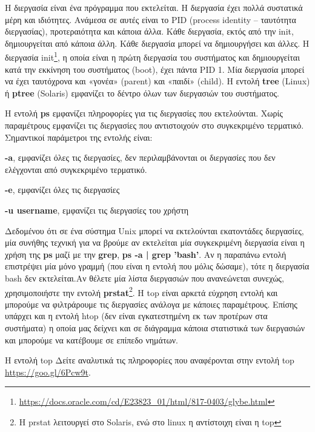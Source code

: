 Η διεργασία είναι ένα πρόγραμμα που εκτελείται. Η διεργασία έχει πολλά συστατικά  μέρη και ιδιότητες. Ανάμεσα σε αυτές είναι το PID (process
identity – ταυτότητα διεργασίας), προτεραιότητα και κάποια άλλα. Κάθε διεργασία, εκτός από την init, δημιουργείται από κάποια άλλη. Κάθε
διεργασία μπορεί να δημιουργήσει και άλλες. Η διεργασία init\footnote{\href{https://docs.oracle.com/cd/E23823\_01/html/817-0403/glybe.html}{https://docs.oracle.com/cd/E23823\_01/html/817-0403/glybe.html}}, η οποία είναι η πρώτη διεργασία του συστήματος και δημιουργείται κατά την
εκκίνηση του συστήματος (boot), έχει πάντα PID 1. Μία διεργασία μπορεί να έχει ταυτόχρονα και «γονέα» (parent) και «παιδί» (child). Η εντολή
\textbf{tree} (Linux) ή \textbf{ptree} (Solaris) εμφανίζει το δέντρο όλων των διεργασιών του συστήματος.

Η εντολή \textbf{ps} εμφανίζει πληροφορίες για τις διεργασίες που εκτελούνται.  Χωρίς παραμέτρους εμφανίζει τις διεργασίες που αντιστοιχούν
στο συγκεκριμένο τερματικό. Σημαντικοί παράμετροι της εντολής είναι:

\begin{packed_item}
	\item   \textbf{-a}, εμφανίζει όλες τις διεργασίες, δεν περιλαμβάνονται οι διεργασίες που δεν ελέγχονται από συγκεκριμένο τερματικό.
	\item   \textbf{-e}, εμφανίζει όλες τις διεργασίες
	\item   \textbf{-u username}, εμφανίζει τις διεργασίες του χρήστη 
\end{packed_item}

Δεδομένου ότι σε ένα σύστημα Unix μπορεί να εκτελούνται εκατοντάδες διεργασίες, μία συνήθης τεχνική για να βρούμε αν εκτελείται μία
συγκεκριμένη διεργασία είναι η χρήση της \textbf{ps} μαζί με την \textbf{grep}, \textbf{ps -a | grep 'bash'}. Αν η παραπάνω εντολή
επιστρέψει μία μόνο γραμμή (που είναι η εντολή που μόλις δώσαμε), τότε η διεργασία bash δεν εκτελείται.Αν θέλετε μία λίστα διεργασιών που
ανανεώνεται συνεχώς, χρησιμοποιήστε την εντολή \textbf{prstat}\footnote{H prstat λειτουργεί στο Solaris, ενώ στο linux η αντίστοιχη είναι η top}. Η top είναι αρκετά εύχρηση εντολή και μπορούμε να φιλτράρουμε τις διεργασίες ανάλογα με κάποιες παραμέτρους. Επίσης υπάρχει και η εντολή htop (δεν είναι εγκατεστημένη εκ των προτέρων στα συστήματα) η οποία μας δείχνει και σε διάγραμμα κάποια στατιστικά των διεργασιών και μπορούμε να κατέβουμε σε επίπεδο νημάτων.


\begin{mybox}{Η εντολή top}
	Δείτε αναλυτικά τις πληροφορίες που αναφέρονται στην εντολή top \href{https://goo.gl/6Pcw9t}{https://goo.gl/6Pcw9t}. 	
\end{mybox}


